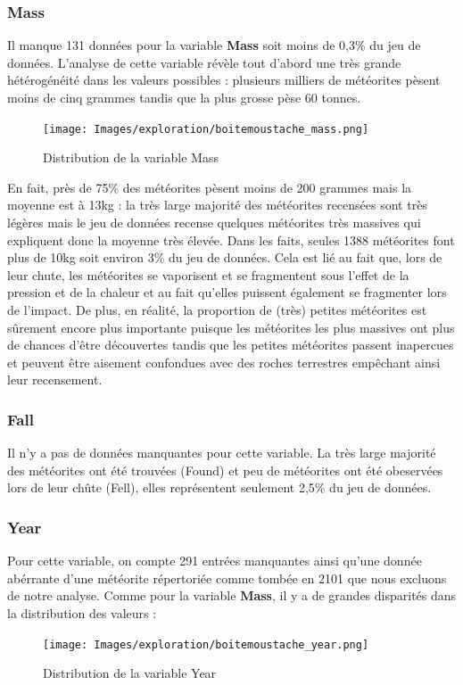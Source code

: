 \documentclass[12pt]{article}
\begin{document}
\subsubsection*{Mass}
Il manque 131 données pour la variable \textbf{Mass} soit moins de 0,3\% du jeu de données. L'analyse de cette variable révèle tout d'abord une très grande hétérogénéité dans les valeurs possibles : plusieurs milliers de météorites pèsent moins de cinq grammes tandis que la plus grosse pèse 60 tonnes.\\
\begin{figure}[H]
    \centering
    \texttt{[image: Images/exploration/boitemoustache\_mass.png]}
    \caption{Distribution de la variable Mass}
\end{figure}
En fait, près de 75\% des météorites pèsent moins de 200 grammes mais la moyenne est à 13kg : la très large majorité des météorites recensées sont très légères mais le jeu de données recense quelques météorites très massives qui expliquent donc la moyenne très élevée. Dans les faits, seules 1388 météorites font plus de 10kg soit environ 3\% du jeu de données. Cela est lié au fait que, lors de leur chute, les météorites se vaporisent et se fragmentent sous l'effet de la pression et de la chaleur et au fait qu'elles puissent également se fragmenter lors de l'impact. De plus, en réalité, la proportion de (très) petites météorites est sûrement encore plus importante puisque les météorites les plus massives ont plus de chances d'être découvertes tandis que les petites météorites passent inapercues et peuvent être aisement confondues avec des roches terrestres empêchant ainsi leur recensement.
\subsubsection*{Fall}
Il n'y a pas de données manquantes pour cette variable. La très large majorité des météorites ont été trouvées (Found) et peu de météorites ont été obeservées lors de leur chûte (Fell), elles représentent seulement 2,5\% du jeu de données.
\subsubsection*{Year}
Pour cette variable, on compte 291 entrées manquantes ainsi qu'une donnée abérrante d'une météorite répertoriée comme tombée en 2101 que nous excluons de notre analyse. Comme pour la variable \textbf{Mass}, il y a de grandes disparités dans la distribution des valeurs :\\
\begin{figure}[H]
    \centering
    \texttt{[image: Images/exploration/boitemoustache\_year.png]}
    \caption{Distribution de la variable Year}
\end{figure}
\end{document}

